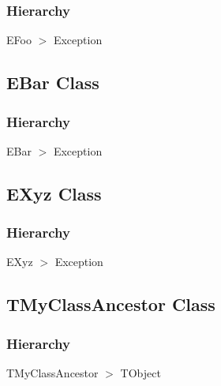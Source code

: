 \documentclass{report}
\newif\ifpdf
\begin{document}
\subsubsection*{\large{\textbf{Hierarchy}}\normalsize\hspace{1ex}\hfill}
EFoo {$>$} Exception
\ifpdf
\subsection*{\large{\textbf{EBar Class}}\normalsize\hspace{1ex}\hrulefill}
\else
\subsection*{EBar Class}
\fi
\label{ok_expanding_descriptions.EBar}
\subsubsection*{\large{\textbf{Hierarchy}}\normalsize\hspace{1ex}\hfill}
EBar {$>$} Exception
\ifpdf
\subsection*{\large{\textbf{EXyz Class}}\normalsize\hspace{1ex}\hrulefill}
\else
\subsection*{EXyz Class}
\fi
\label{ok_expanding_descriptions.EXyz}
\subsubsection*{\large{\textbf{Hierarchy}}\normalsize\hspace{1ex}\hfill}
EXyz {$>$} Exception
\ifpdf
\subsection*{\large{\textbf{TMyClassAncestor Class}}\normalsize\hspace{1ex}\hrulefill}
\else
\subsection*{TMyClassAncestor Class}
\fi
\label{ok_expanding_descriptions.TMyClassAncestor}
\subsubsection*{\large{\textbf{Hierarchy}}\normalsize\hspace{1ex}\hfill}
TMyClassAncestor {$>$} TObject
\end{document}
